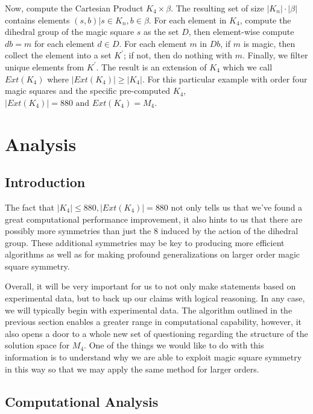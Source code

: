 \documentclass[12pt]{report}
\begin{document}
\par Now, compute the Cartesian Product $K_4 \times \beta$. The resulting set of size $\left|K_n
  \right|\cdot \left|\beta \right|$ contains elements $\left(s, b\right)\vert s\in K_n, b\in
  \beta$.
For each element in $K_4$, compute the dihedral group of the magic square $s$ as the set $D$, then
element-wise compute $db=m$ for each element $d\in D$. For each element $m$ in $Db$, if $m$ is
magic, then collect the element into a set $K^\prime$; if not, then do nothing with $m$. Finally,
we filter unique elements from $K^\prime$. The result is an extension of $K_4$ which we call
$Ext\left(K_4\right)$ where $\left|Ext\left(K_4\right) \right|\geq \left|K_4 \right|$. For this
particular example with order four magic squares and the specific pre-computed $K_4$,
$\left|Ext\left(K_4\right) \right|=880 \text{ and } Ext\left(K_4\right)=M_4$.

\chapter{Analysis}

\section{Introduction} The fact that $\left|K_4\right|\leq 880, \left|Ext\left(K_4
  \right)\right|=880$ not only tells us that we've found a great computational performance
improvement, it also hints to us that there are possibly more symmetries than just the 8 induced by
the action of the dihedral group. These additional symmetries may be key to producing more
efficient algorithms as well as for making profound generalizations on larger order magic square
symmetry.

\par Overall, it will be very important for us to not only make statements based on experimental
data, but to back up our claims with logical reasoning. In any case, we will typically begin with
experimental data. The algorithm outlined in the previous section enables a greater range in
computational capability, however, it also opens a door to a whole new set of questioning regarding
the structure of the solution space for $M_4$. One of the things we would like to do with this
information is to understand why we are able to exploit magic square symmetry in this way so that
we may apply the same method for larger orders.

\section{Computational Analysis}
\end{document}
